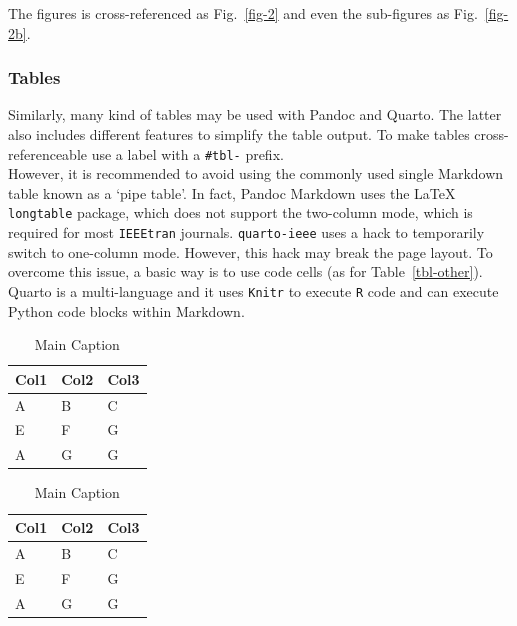 \documentclass[
  journal,
]{IEEEtran}%
\theoremstyle{plain}
\theoremstyle{remark}
\begin{document}
The figures is cross-referenced as Fig.~\ref{fig-2} and even the
sub-figures as Fig.~\ref{fig-2b}.

\hypertarget{sec-tables}{%
\subsubsection{Tables}\label{sec-tables}}

Similarly, many kind of tables may be used with Pandoc and Quarto. The
latter also includes different features to simplify the table output. To
make tables cross-referenceable use a label with a \texttt{\#tbl-}
prefix.\\
However, it is recommended to avoid using the commonly used single
Markdown table known as a `pipe table'. In fact, Pandoc Markdown uses
the {\LaTeX} \texttt{longtable} package, which does not support the
two-column mode, which is required for most \texttt{IEEEtran} journals.
\texttt{quarto-ieee} uses a hack to temporarily switch to one-column
mode. However, this hack may break the page layout. To overcome this
issue, a basic way is to use code cells (as for Table~\ref{tbl-other}).
Quarto is a multi-language and it uses \texttt{Knitr} to execute
\texttt{R} code and can execute Python code blocks within Markdown.

\begin{table}

\caption{\label{tbl-panel}Main
Caption}\begin{minipage}[t]{0.50\linewidth}

{\centering 

\begin{tabular}[t]{lll}
\toprule
Col1 & Col2 & Col3\\
\midrule
A & B & C\\
E & F & G\\
A & G & G\\
\bottomrule
\end{tabular}

}

\end{minipage}%
%
\begin{minipage}[t]{0.50\linewidth}

{\centering 

\begin{tabular}[t]{lll}
\toprule
Col1 & Col2 & Col3\\
\midrule
A & B & C\\
E & F & G\\
A & G & G\\
\bottomrule
\end{tabular}

}

\end{minipage}%

\end{table}
\end{document}
